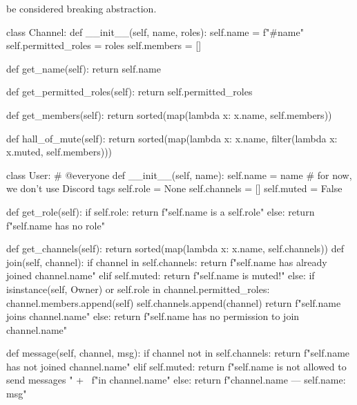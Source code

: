 be considered breaking abstraction.
\begin{python}
class Channel:
    def __init__(self, name, roles):
        self.name = f"#{name}"
        self.permitted_roles = roles
        self.members = []

    def get_name(self):
        return self.name

    def get_permitted_roles(self):
        return self.permitted_roles

    def get_members(self):
        return sorted(map(lambda x: x.name, self.members))

    def hall_of_mute(self):
        return sorted(map(lambda x: x.name,
               filter(lambda x: x.muted, self.members)))

class User: # @everyone
    def __init__(self, name):
        self.name = name # for now, we don't use Discord tags
        self.role = None
        self.channels = []
        self.muted = False

    def get_role(self):
        if self.role:
            return f"{self.name} is a {self.role}"
        else:
            return f"{self.name} has no role"
        
    def get_channels(self):
        return sorted(map(lambda x: x.name, self.channels))
    def join(self, channel):
        if channel in self.channels:
            return f"{self.name} has already joined {channel.name}"
        elif self.muted:
            return f"{self.name} is muted!"
        else:
            if isinstance(self, Owner) or self.role in channel.permitted_roles:
                channel.members.append(self)
                self.channels.append(channel)
                return f"{self.name} joins {channel.name}"
            else:
                return f"{self.name} has no permission to join {channel.name}"

    def message(self, channel, msg):
        if channel not in self.channels:
            return f"{self.name} has not joined {channel.name}"
        elif self.muted:
            return f"{self.name} is not allowed to send messages " + \
                   f"in {channel.name}"
        else:
            return f"{channel.name} --- {self.name}: {msg}"


\end{python}
